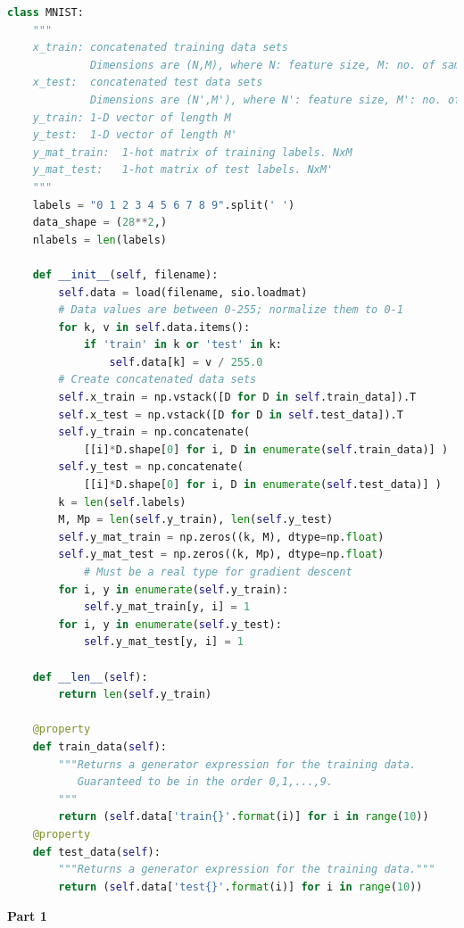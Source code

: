\documentclass{article}
\begin{document}
\begin{biomathy}
\begin{lstlisting}[language=python]
class MNIST:
    """
    x_train: concatenated training data sets
             Dimensions are (N,M), where N: feature size, M: no. of samples
    x_test:  concatenated test data sets
             Dimensions are (N',M'), where N': feature size, M': no. of samples
    y_train: 1-D vector of length M
    y_test:  1-D vector of length M'
    y_mat_train:  1-hot matrix of training labels. NxM
    y_mat_test:   1-hot matrix of test labels. NxM'
    """
    labels = "0 1 2 3 4 5 6 7 8 9".split(' ')
    data_shape = (28**2,)
    nlabels = len(labels)

    def __init__(self, filename):
        self.data = load(filename, sio.loadmat)
        # Data values are between 0-255; normalize them to 0-1
        for k, v in self.data.items():
            if 'train' in k or 'test' in k:
                self.data[k] = v / 255.0
        # Create concatenated data sets
        self.x_train = np.vstack([D for D in self.train_data]).T
        self.x_test = np.vstack([D for D in self.test_data]).T
        self.y_train = np.concatenate(
            [[i]*D.shape[0] for i, D in enumerate(self.train_data)] )
        self.y_test = np.concatenate(
            [[i]*D.shape[0] for i, D in enumerate(self.test_data)] )
        k = len(self.labels)
        M, Mp = len(self.y_train), len(self.y_test)
        self.y_mat_train = np.zeros((k, M), dtype=np.float)
        self.y_mat_test = np.zeros((k, Mp), dtype=np.float)
            # Must be a real type for gradient descent
        for i, y in enumerate(self.y_train):
            self.y_mat_train[y, i] = 1
        for i, y in enumerate(self.y_test):
            self.y_mat_test[y, i] = 1

    def __len__(self):
        return len(self.y_train)

    @property
    def train_data(self):
        """Returns a generator expression for the training data.
           Guaranteed to be in the order 0,1,...,9.
        """
        return (self.data['train{}'.format(i)] for i in range(10))
    @property
    def test_data(self):
        """Returns a generator expression for the training data."""
        return (self.data['test{}'.format(i)] for i in range(10))
\end{lstlisting}
\end{biomathy}


\vspace{1cm}


\begin{center}
\textbf{Part 1 }
\end{center}
\end{document}
